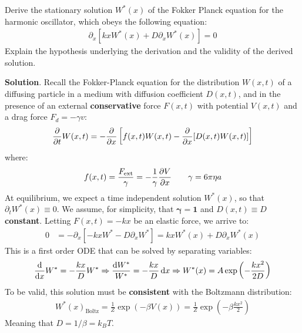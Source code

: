 \documentclass[../template.tex]{subfiles}
\begin{document}
\begin{exo}
    Derive the stationary solution $W^*(x)$ of the Fokker Planck equation for the harmonic oscillator, which obeys the following equation:
    \begin{align*}
        \partial_x [k x W^*(x) + D\partial_x W^*(x)] = 0
    \end{align*}
    Explain the hypothesis underlying the derivation and the validity of the derived solution.
    \medskip

    \textbf{Solution}. Recall the Fokker-Planck equation for the distribution $W(x,t)$ of a diffusing particle in a medium with diffusion coefficient $D(x,t)$, and in the presence of an external \textbf{conservative} force $F(x,t)$ with potential $V(x,t)$ and a drag force $F_d = - \gamma v$:
    \begin{align*}
        \pdv{t} W(x,t) = -\pdv{x} \left[f(x,t) W(x,t) - \pdv{x} [ D(x,t) W(x,t)]\right]
    \end{align*}
    where:
    \begin{align*}
        f(x,t) = \frac{F_{\mathrm{ext} }}{\gamma} = -\frac{1}{\gamma} \pdv{V}{x} (x)   \qquad \gamma = 6 \pi \eta a
    \end{align*}
    At equilibrium, we expect a time independent solution $W^*(x)$, so that $\partial_t W^*(x) \equiv 0$. We assume, for simplicity, that $\bm{\gamma = 1}$ and $D(x,t) \equiv D$ \textbf{constant}. Letting $F(x,t) = -kx$ be an elastic force, we arrive to:
    \begin{align*}
        0 &= - \partial_x [-kx W^* - D \partial_x W^*] = kx W^*(x) + D \partial_x W^*(x)
    \end{align*}
    This is a first order ODE that can be solved by separating variables:
    \begin{align*}
        \dv{x} W^* = -\frac{kx}{D}W^* \Rightarrow  \frac{\dd{W^*}}{W^*} = -\frac{kx}{D} \dd{x} \Rightarrow W^*(x) = A \exp\left(-\frac{k x^2}{2D} \right) 
    \end{align*}
    To be valid, this solution must be \textbf{consistent} with the Boltzmann distribution:
    \begin{align*}
        W^*(x)_{\mathrm{Boltz}} = \frac{1}{Z} \exp(- \beta V(x)) = \frac{1}{Z} \exp\left(-\beta \frac{kx^2}{2}\right )  
    \end{align*} 
    Meaning that $D = 1/\beta = k_B T$.
\end{exo}
\end{document}
